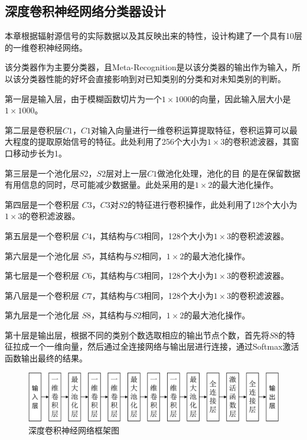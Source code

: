 \subsection{深度卷积神经网络分类器设计}
本章根据辐射源信号的实际数据以及其反映出来的特性，设计构建了一个具有10层的一维卷积神经网络。

该分类器作为主要分类器，且Meta-Recognition是以该分类器的输出作为输入，所以该分类器性能的好坏会直接影响到对已知类别的分类和对未知类别的判断。

第一层是输入层，由于模糊函数切片为一个$1 \times 1000$的向量，因此输入层大小是$1 \times 1000$。 

第二层是卷积层$C1$，$C1$对输入向量进行一维卷积运算提取特征，卷积运算可以最
大程度的提取原始信号的特征。此处利用了256个大小为$1\times 3$的卷积滤波器，其窗口移动步长为1。

第三层是一个池化层$S2$，$S2$层对上一层$C1$做池化处理，池化的目
的是在保留数据有用信息的同时，尽可能减少数据量。此处采用的是$1\times 2$的最大池化操作。

第四层是一个卷积层 $C3$，$C3$对$S2$的特征进行卷积操作，此处利用了128个大小为$1\times 3$的卷积滤波器。

第五层是一个卷积层 $C4$，其结构与$C3$相同，128个大小为$1\times 3$的卷积滤波器。

第六层是一个池化层 $S5$，其结构与$S2$相同，$1\times 2$的最大池化操作。

第七层是一个卷积层 $C6$，其结构与$C3$相同，128个大小为$1\times 3$的卷积滤波器。

第八层是一个卷积层 $C7$，其结构与$C3$相同，128个大小为$1\times 3$的卷积滤波器。

第九层是一个池化层 $S8$，其结构与$S2$相同，$1\times 2$的最大池化操作。

第十层是输出层，根据不同的类别个数选取相应的输出节点个数，首先将$S8$的特征拉成一个一维向量，然后通过全连接网络与输出层进行连接，通过Softmax激活函数输出最终的结果。




\begin{figure}[htb]
	\centering
	\includegraphics[width=\textwidth]{figures/emitter/struct_emitter}
	\caption{深度卷积神经网络框架图}
\end{figure}

